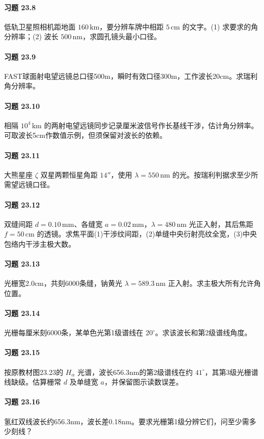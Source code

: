 \paragraph{习题 23.8}
低轨卫星照相机距地面 \(160\,\mathrm{km}\)，要分辨车牌中相距 \(5\,\mathrm{cm}\) 的文字。(1) 求要求的角分辨率；(2) 波长 \(500\,\mathrm{nm}\)，求圆孔镜头最小口径。
\paragraph{习题 23.9}
FAST球面射电望远镜总口径500m，瞬时有效口径300m，工作波长20cm。求瑞利角分辨率。
\paragraph{习题 23.10}
相隔 \(10^4\,\mathrm{km}\) 的两射电望远镜同步记录厘米波信号作长基线干涉，估计角分辨率。可取波长5cm作数值示例，但须保留对波长的依赖。
\paragraph{习题 23.11}
大熊星座 \(\zeta\) 双星两颗恒星角距 \(14''\)，使用 \(\lambda=550\,\mathrm{nm}\) 的光。按瑞利判据求至少所需望远镜口径。
\paragraph{习题 23.12}
双缝间距 \(d=0.10\,\mathrm{mm}\)、各缝宽 \(a=0.02\,\mathrm{mm}\)，\(\lambda=480\,\mathrm{nm}\) 光正入射，其后焦距 \(f=50\,\mathrm{cm}\) 的透镜。求焦平面(1)干涉纹间距，(2)单缝中央衍射亮纹全宽，(3)中央包络内干涉主极大数。
\paragraph{习题 23.13}
光栅宽2.0cm，共刻6000条缝，钠黄光 \(\lambda=589.3\,\mathrm{nm}\) 正入射。求主极大所有允许角位置。
\paragraph{习题 23.14}
光栅每厘米刻6000条，某单色光第1级谱线在 \(20^\circ\)。求该波长和第2级谱线角度。
\paragraph{习题 23.15}
按原教材图23.23的 \(H_\alpha\) 光谱，波长656.3nm的第2级谱线在约 \(41^\circ\)，其第3级光栅谱线缺级。估算栅常 \(d\) 及单缝宽 \(a\)，并保留图示读数误差。
\paragraph{习题 23.16}
氢红双线波长约656.3nm，波长差0.18nm。要求光栅第1级分辨它们，问至少需多少刻线？
